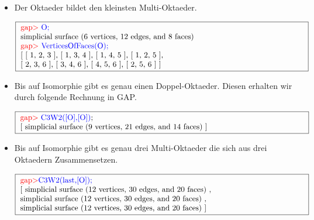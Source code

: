 \documentclass[12pt,titlepage,twoside,cleardoublepage]{article}
\theoremstyle{nummermitklammern}
\numberwithin{equation}{section}
\begin{document}
\begin{itemize}
\item Der Oktaeder bildet den kleinsten Multi-Oktaeder.
\begin{center}
$\fbox{
\parbox{13cm}{
\textcolor{red}{gap$>$} \textcolor{blue}{O;}\newline 
simplicial surface (6 vertices, 12 edges, and 8 faces) \newline
\textcolor{red}{gap$>$} \textcolor{blue}{VerticesOfFaces(O);}\newline
[ [ 1, 2, 3 ], [ 1, 3, 4 ], [ 1, 4, 5 ], [ 1, 2, 5 ], \newline
[ 2, 3, 6 ], [ 3, 4, 6 ], [ 4, 5, 6 ], [ 2, 5, 6 ] ]
}}$
\end{center}

\item Bis auf Isomorphie gibt es genau einen Doppel-Oktaeder. Diesen erhalten wir durch folgende Rechnung in GAP.
\begin{center}
$\fbox{
\parbox{13cm}{
\textcolor{red}{gap$>$} \textcolor{blue}{C3W2([O],[O])};\newline
[ simplicial surface (9 vertices, 21 edges, and 14 faces) ]
}}$
\end{center}
\item Bis auf Isomorphie gibt es genau drei Multi-Oktaeder die sich aus drei Oktaedern Zusammensetzen.
\begin{center}
$\fbox{
\parbox{13cm}{
\textcolor{red}{gap$>$}\textcolor{blue}{ C3W2(last,[O]);}\newline
[ simplicial surface (12 vertices, 30 edges, and 20 faces)
    ,\newline
     simplicial surface (12 vertices, 30 edges, and 20 faces)
    ,\newline
  simplicial surface (12 vertices, 30 edges, and 20 faces)
 ]
}}$
\end{center}
\end{itemize}
\end{document}
